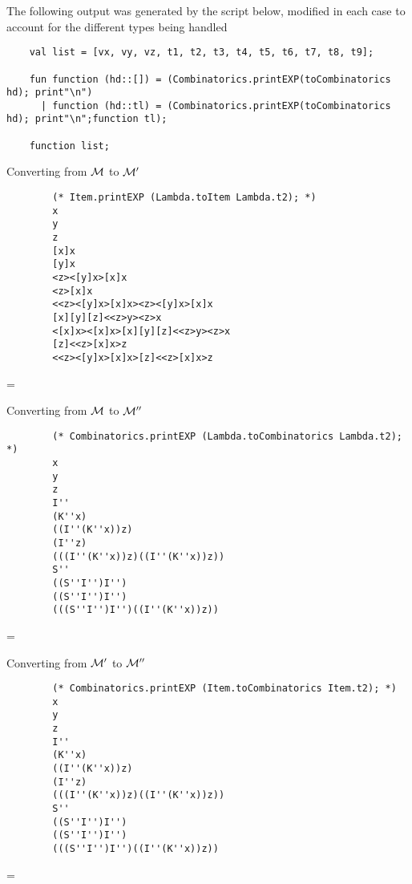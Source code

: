 \documentclass[11pt]{article}
\newenvironment{neverbreak} %
{\par\nobreak\vfil\penalty0\vfilneg
	\vtop\bgroup}
{\par\xdef\tpd{\the\prevdepth}\egroup
	\prevdepth=\tpd}
\begin{document}
\begin{enumerate}
The following output was generated by the script below, modified in each case to account for the different types being handled
\begin{verbatim}
	val list = [vx, vy, vz, t1, t2, t3, t4, t5, t6, t7, t8, t9];

	fun function (hd::[]) = (Combinatorics.printEXP(toCombinatorics hd); print"\n")
	  | function (hd::tl) = (Combinatorics.printEXP(toCombinatorics hd); print"\n";function tl); 

	function list;
\end{verbatim}
\vspace{1cm}
\begin{neverbreak}
	Converting from ${\cal M}$ to ${\cal M}'$
	\begin{verbatim}
		(* Item.printEXP (Lambda.toItem Lambda.t2); *)
		x
		y
		z
		[x]x
		[y]x
		<z><[y]x>[x]x
		<z>[x]x
		<<z><[y]x>[x]x><z><[y]x>[x]x
		[x][y][z]<<z>y><z>x
		<[x]x><[x]x>[x][y][z]<<z>y><z>x
		[z]<<z>[x]x>z
		<<z><[y]x>[x]x>[z]<<z>[x]x>z
	\end{verbatim}
\end{neverbreak}
\vspace{1cm}
\begin{neverbreak}
	Converting from ${\cal M}$ to ${\cal M}''$
	\begin{verbatim}
		(* Combinatorics.printEXP (Lambda.toCombinatorics Lambda.t2); *)
		x
		y
		z
		I''
		(K''x)
		((I''(K''x))z)
		(I''z)
		(((I''(K''x))z)((I''(K''x))z))
		S''
		((S''I'')I'')
		((S''I'')I'')
		(((S''I'')I'')((I''(K''x))z))
	\end{verbatim}
\end{neverbreak}
\vspace{1cm}

\begin{neverbreak}
	Converting from ${\cal M}'$ to ${\cal M}''$
	\begin{verbatim}
		(* Combinatorics.printEXP (Item.toCombinatorics Item.t2); *)
		x
		y
		z
		I''
		(K''x)
		((I''(K''x))z)
		(I''z)
		(((I''(K''x))z)((I''(K''x))z))
		S''
		((S''I'')I'')
		((S''I'')I'')
		(((S''I'')I'')((I''(K''x))z))
	\end{verbatim}
\end{neverbreak}


\end{enumerate}
\end{document}

